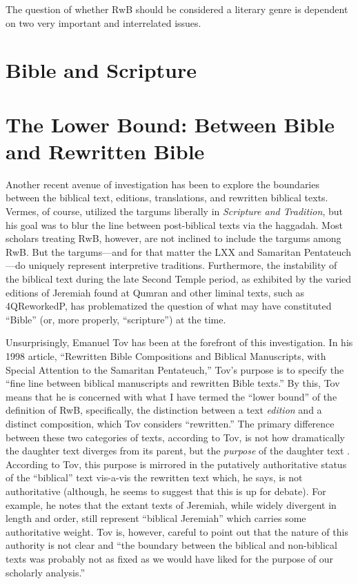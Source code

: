 The question of whether RwB should be considered a literary genre is
dependent on two very important and interrelated issues.

\section{Bible and Scripture}\label{bible-and-scripture}

\section{The Lower Bound: Between Bible and Rewritten
Bible}\label{the-lower-bound-between-bible-and-rewritten-bible}

Another recent avenue of investigation has been to explore the
boundaries between the biblical text, editions, translations, and
rewritten biblical texts. Vermes, of course, utilized the targums
liberally in \emph{Scripture and Tradition}, but his goal was to blur
the line between post-biblical texts via the haggadah. Most scholars
treating RwB, however, are not inclined to include the targums among
RwB. But the targums---and for that matter the LXX and Samaritan
Pentateuch---do uniquely represent interpretive traditions. Furthermore,
the instability of the biblical text during the late Second Temple
period, as exhibited by the varied editions of Jeremiah found at Qumran
and other liminal texts, such as 4QReworkedP, has problematized the
question of what may have constituted ``Bible'' (or, more properly,
``scripture'') at the time.

Unsurprisingly, Emanuel Tov has been at the forefront of this
investigation. In his 1998 article, ``Rewritten Bible Compositions and
Biblical Manuscripts, with Special Attention to the Samaritan
Pentateuch,'' Tov's purpose is to specify the ``fine line between
biblical manuscripts and rewritten Bible
texts.''\autocite[334]{tov_dsd1998} By this, Tov means that he is
concerned with what I have termed the ``lower bound'' of the definition
of RwB, specifically, the distinction between a text \emph{edition} and
a distinct composition, which Tov considers ``rewritten.'' The primary
difference between these two categories of texts, according to Tov, is
not how dramatically the daughter text diverges from its parent, but the
\emph{purpose} of the daughter text \autocite[334]{tov_dsd1998}.
According to Tov, this purpose is mirrored in the putatively
authoritative status of the ``biblical'' text vis-a-vis the rewritten
text which, he says, is not authoritative (although, he seems to suggest
that this is up for debate\autocite[337]{tov_dsd1998}). For example, he
notes that the extant texts of Jeremiah, while widely divergent in
length and order, still represent ``biblical Jeremiah'' which carries
some authoritative weight. Tov is, however, careful to point out that
the nature of this authority is not clear and ``the boundary between the
biblical and non-biblical texts was probably not as fixed as we would
have liked for the purpose of our scholarly
analysis.''\autocite[335]{tov_dsd1998}

